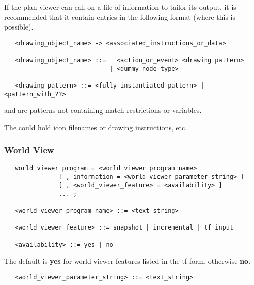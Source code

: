 If the plan viewer can call on a file of information to tailor
its output, it is recommended that it contain entries in the following format
(where this is possible).

\begin{verbatim}
   <drawing_object_name> -> <associated_instructions_or_data>

   <drawing_object_name> ::=   <action_or_event> <drawing pattern>
                             | <dummy_node_type>

   <drawing_pattern> ::= <fully_instantiated_pattern> | <pattern_with_??>

\end{verbatim}

 and 
are patterns not containing match restrictions or variables.

The  could hold icon filenames or
drawing instructions, etc.

\subsubsection{World View}

\begin{verbatim}
   world_viewer program = <world_viewer_program_name>
               [ , information = <world_viewer_parameter_string> ]
               [ , <world_viewer_feature> = <availability> ]
               ... ;

   <world_viewer_program_name> ::= <text_string>

   <world_viewer_feature> ::= snapshot | incremental | tf_input

   <availability> ::= yes | no
\end{verbatim}

The default is {\bf yes} for world viewer features
listed in the {\sc tf} form, otherwise {\bf no}.

\begin{verbatim}
   <world_viewer_parameter_string> ::= <text_string>
\end{verbatim}


